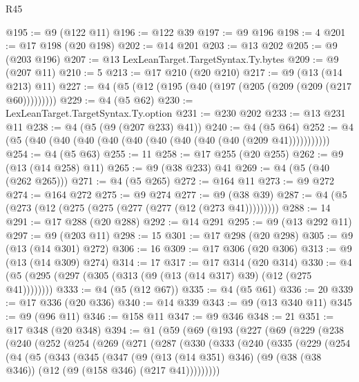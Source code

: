 \begin{lexlean}{R45}
\begin{coremodule}
@195 := @9 (@122 @11)
@196 := @122 @39
@197 := @9 @196
@198 := 4
@201 := @17 @198 (@20 @198)
@202 := @14 @201
@203 := @13 @202
@205 := @9 (@203 @196)
@207 := @13 LexLeanTarget.TargetSyntax.Ty.bytes
@209 := @9 (@207 @11)
@210 := 5
@213 := @17 @210 (@20 @210)
@217 := @9 (@13 (@14 @213) @11)
@227 := @4 (@5 (@12 (@195 (@40 (@197 (@205 (@209 (@209 (@217 @60)))))))))
@229 := @4 (@5 @62)
@230 := LexLeanTarget.TargetSyntax.Ty.option
@231 := @230 @202
@233 := @13 @231 @11
@238 := @4 (@5 (@9 (@207 @233) @41))
@240 := @4 (@5 @64)
@252 := @4 (@5 (@40 (@40 (@40 (@40 (@40 (@40 (@40 (@40 (@40 (@209 @41)))))))))))
@254 := @4 (@5 @63)
@255 := 11
@258 := @17 @255 (@20 @255)
@262 := @9 (@13 (@14 @258) @11)
@265 := @9 (@38 @233) @41
@269 := @4 (@5 (@40 (@262 @265)))
@271 := @4 (@5 @265)
@272 := @164 @11
@273 := @9 @272
@274 := @164 @272
@275 := @9 @274
@277 := @9 (@38 @39)
@287 := @4 (@5 (@273 (@12 (@275 (@275 (@277 (@277 (@12 (@273 @41)))))))))
@288 := 14
@291 := @17 @288 (@20 @288)
@292 := @14 @291
@295 := @9 (@13 @292 @11)
@297 := @9 (@203 @11)
@298 := 15
@301 := @17 @298 (@20 @298)
@305 := @9 (@13 (@14 @301) @272)
@306 := 16
@309 := @17 @306 (@20 @306)
@313 := @9 (@13 (@14 @309) @274)
@314 := 17
@317 := @17 @314 (@20 @314)
@330 := @4 (@5 (@295 (@297 (@305 (@313 (@9 (@13 (@14 @317) @39) (@12 (@275 @41))))))))
@333 := @4 (@5 (@12 @67))
@335 := @4 (@5 @61)
@336 := 20
@339 := @17 @336 (@20 @336)
@340 := @14 @339
@343 := @9 (@13 @340 @11)
@345 := @9 (@96 @11)
@346 := @158 @11
@347 := @9 @346
@348 := 21
@351 := @17 @348 (@20 @348)
@394 := @1
    (@59
      (@69
        (@193
          (@227
            (@69
              (@229
                (@238
                  (@240
                    (@252
                      (@254
                        (@269
                          (@271
                            (@287
                              (@330
                                (@333
                                  (@240
                                    (@335
                                      (@229
                                        (@254
                                          (@4
                                            (@5
                                              (@343
                                                (@345
                                                  (@347
                                                    (@9
                                                      (@13 (@14 @351) @346)
                                                      (@9
                                                        (@38 (@38 @346))
                                                        (@12 (@9 (@158 @346) (@217 @41)))))))))

\end{coremodule}
\end{lexlean}
